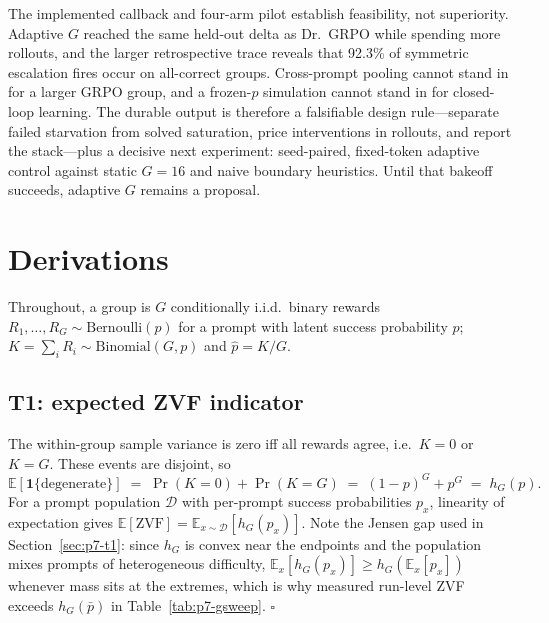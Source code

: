 \documentclass{article}
\newcommand{\E}{\mathbb{E}}
\begin{document}
The implemented callback and four-arm pilot establish feasibility, not
superiority. Adaptive $G$ reached the same held-out delta as Dr.~GRPO while
spending more rollouts, and the larger retrospective trace reveals that 92.3\%
of symmetric escalation fires occur on all-correct groups. Cross-prompt pooling
cannot stand in for a larger GRPO group, and a frozen-$p$ simulation cannot stand
in for closed-loop learning. The durable output is therefore a falsifiable design
rule---separate failed starvation from solved saturation, price interventions in
rollouts, and report the stack---plus a decisive next experiment: seed-paired,
fixed-token adaptive control against static $G{=}16$ and naive boundary
heuristics. Until that bakeoff succeeds, adaptive $G$ remains a proposal.
 \appendix
\section{Derivations}
\label{sec:p7-appendix}
Throughout, a group is $G$ conditionally i.i.d.\ binary rewards
$R_1, \dots, R_G \sim \mathrm{Bernoulli}(p)$ for a prompt with latent
success probability $p$; $K = \sum_i R_i \sim \mathrm{Binomial}(G, p)$ and
$\hat p = K/G$.

\subsection{T1: expected ZVF indicator}
\label{sec:p7-appendix-t1}
The within-group sample variance is zero iff all rewards agree, i.e.\
$K = 0$ or $K = G$. These events are disjoint, so
\begin{equation}
  \E[\mathbf{1}\{\text{degenerate}\}]
  \;=\; \Pr(K = 0) + \Pr(K = G)
  \;=\; (1-p)^G + p^G
  \;=\; h_G(p).
\end{equation}
For a prompt population $\mathcal{D}$ with per-prompt success probabilities
$p_x$, linearity of expectation gives
$\E[\mathrm{ZVF}] = \E_{x \sim \mathcal{D}}[h_G(p_x)]$. Note the Jensen gap
used in Section~\ref{sec:p7-t1}: since $h_G$ is convex near the endpoints
and the population mixes prompts of heterogeneous difficulty,
$\E_x[h_G(p_x)] \geq h_G(\E_x[p_x])$ whenever mass sits at the extremes,
which is why measured run-level ZVF exceeds $h_G(\bar p)$ in
Table~\ref{tab:p7-gsweep}. \hfill$\square$
\end{document}
